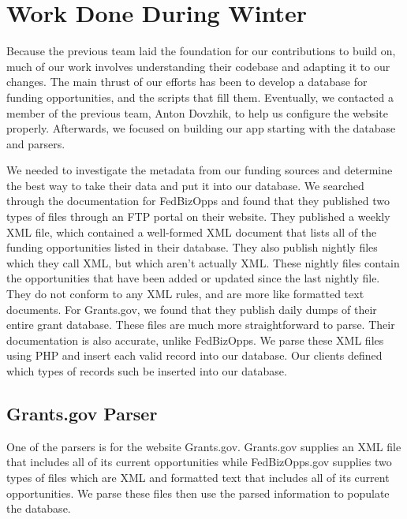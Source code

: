 \documentclass[onecolumn]{IEEEtran}
\begin{document}
\section{Work Done During Winter}
Because the previous team laid the foundation for our contributions to build on, much of our work involves understanding their codebase and adapting it to our changes. The main thrust of our efforts has been to develop a database for funding opportunities, and the scripts that fill them. Eventually, we contacted a member of the previous team, Anton Dovzhik, to help us configure the website properly. Afterwards, we focused on building our app starting with the database and parsers.

We needed to investigate the metadata from our funding sources and determine the best way to take their data and put it into our database. We searched through the documentation for FedBizOpps and found that they published two types of files through an FTP portal on their website. They published a weekly XML file, which contained a well-formed XML document that lists all of the funding opportunities listed in their database. They also publish nightly files which they call XML, but which aren't actually XML. These nightly files contain the opportunities that have been added or updated since the last nightly file. They do not conform to any XML rules, and are more like formatted text documents. For Grants.gov, we found that they publish daily dumps of their entire grant database. These files are much more straightforward to parse. Their documentation is also accurate, unlike FedBizOpps. We parse these XML files using PHP and insert each valid record into our database. Our clients defined which types of records such be inserted into our database. 

\subsection{Grants.gov Parser}
One of the parsers is for the website Grants.gov. Grants.gov supplies an XML file that includes all of its current opportunities while FedBizOpps.gov supplies two types of files which are XML and formatted text that includes all of its current opportunities. We parse these files then use the parsed information to populate the database.  
\end{document}
